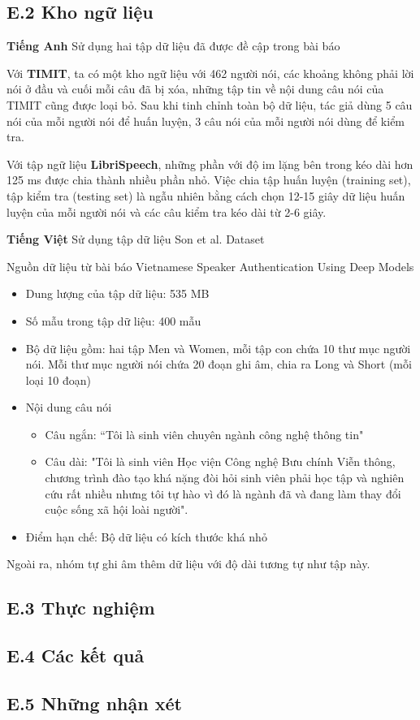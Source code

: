 \documentclass{article}
\begin{document}
	\subsection{E.2 Kho ngữ liệu}
	\qquad \textbf{Tiếng Anh} Sử dụng hai tập dữ liệu đã được đề cập trong bài báo
	
	Với \textbf{TIMIT}, ta có một kho ngữ liệu với 462 người nói, các khoảng không phải lời nói ở đầu và cuối mỗi câu đã bị xóa, những tập tin về nội dung câu nói của TIMIT cũng được loại bỏ. Sau khi tinh chỉnh toàn bộ dữ liệu, tác giả dùng 5 câu nói của mỗi người nói để huấn luyện, 3 câu nói của mỗi người nói dùng để kiểm tra.
	
	Với tập ngữ liệu \textbf{LibriSpeech}, những phần với độ im lặng bên trong kéo dài hơn 125 ms được chia thành nhiều phần nhỏ. Việc chia tập huấn luyện (training set), tập kiểm tra (testing set) là ngẫu nhiên bằng cách chọn 12-15 giây dữ liệu huấn luyện của mỗi người nói và các câu kiểm tra kéo dài từ 2-6 giây. 
	
	\textbf{Tiếng Việt} Sử dụng tập dữ liệu Son et al. Dataset
	
	Nguồn dữ liệu từ bài báo Vietnamese Speaker Authentication Using Deep Models
	\begin{itemize}
		\item Dung lượng của tập dữ liệu: 535 MB
		\item Số mẫu trong tập dữ liệu: 400 mẫu
		\item Bộ dữ liệu gồm: hai tập  Men và Women, mỗi tập con chứa 10 thư mục người nói. Mỗi thư mục người nói chứa 20 đoạn ghi âm, chia ra Long và Short (mỗi loại 10 đoạn) 
		\item Nội dung câu nói
		\begin{itemize}
			\item Câu ngắn: “Tôi là sinh viên chuyên ngành công nghệ thông tin"
			\item Câu dài: "Tôi là sinh viên Học viện Công nghệ Bưu chính Viễn thông, chương trình đào tạo khá nặng đòi hỏi sinh viên phải học tập và nghiên cứu rất nhiều nhưng tôi tự hào vì đó là ngành đã và đang làm thay đổi cuộc sống xã hội loài người".
		\end{itemize}
		\item Điểm hạn chế: Bộ dữ liệu có kích thước khá nhỏ
	\end{itemize}
	
	Ngoài ra, nhóm tự ghi âm thêm dữ liệu với độ dài tương tự như tập này.
	\subsection{E.3 Thực nghiệm}
	
	\subsection{E.4 Các kết quả}
	
	\subsection{E.5 Những nhận xét}
	
	\nocite{*}
	\newpage\cleardoublepage
	
	
\end{document}
